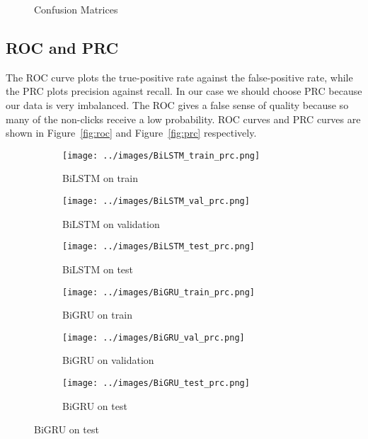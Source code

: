 \documentclass[utf8x]{ctexart}
\begin{document}
\begin{figure}[htb]
  \caption{Confusion Matrices}
  \label{fig:confusion}
\end{figure}

\subsection{ROC and PRC}

The ROC curve plots the true-positive rate against the false-positive rate, while the PRC plots precision against recall. In our case we should choose PRC because our data is very imbalanced. The ROC gives a false sense of quality because so many of the non-clicks receive a low probability. ROC curves and PRC curves are shown in  Figure~\ref{fig:roc} and Figure~\ref{fig:prc} respectively.

\begin{figure}[htb]
  \centering
  \begin{subfigure}[b]{0.32\textwidth}
    \centering
    \texttt{[image: ../images/BiLSTM\_train\_prc.png]}
    \caption{BiLSTM on train}
    \label{fig:BiLSTM_prc_train}
  \end{subfigure}
  \begin{subfigure}[b]{0.32\textwidth}
    \centering
    \texttt{[image: ../images/BiLSTM\_val\_prc.png]}
    \caption{BiLSTM on validation}
    \label{fig:BiLSTM_prc_val}
  \end{subfigure}
  \begin{subfigure}[b]{0.32\textwidth}
    \centering
    \texttt{[image: ../images/BiLSTM\_test\_prc.png]}
    \caption{BiLSTM on test}
    \label{fig:BiLSTM_prc_test}
  \end{subfigure}


  \begin{subfigure}[b]{0.32\textwidth}
    \centering
    \texttt{[image: ../images/BiGRU\_train\_prc.png]}
    \caption{BiGRU on train}
    \label{fig:BiGRU_prc_train}
  \end{subfigure}
  \begin{subfigure}[b]{0.32\textwidth}
    \centering
    \texttt{[image: ../images/BiGRU\_val\_prc.png]}
    \caption{BiGRU on validation}
    \label{fig:BiGRU_prc_val}
  \end{subfigure}
  \begin{subfigure}[b]{0.32\textwidth}
    \centering
    \texttt{[image: ../images/BiGRU\_test\_prc.png]}
    \caption{BiGRU on test}
    \label{fig:BiGRU_prc_test}
  \end{subfigure}



\end{figure}
\end{document}
